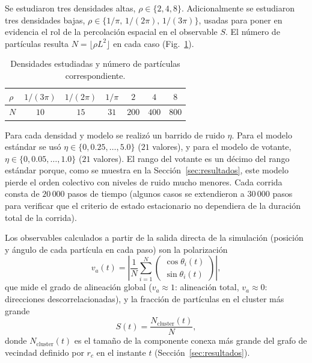 \documentclass[11pt,a4paper]{article}
\begin{document}
Se estudiaron tres densidades altas, $\rho \in \{2, 4, 8\}$. Adicionalmente
se estudiaron tres densidades bajas, $\rho \in \{1/\pi,\, 1/(2\pi),\,
1/(3\pi)\}$, usadas para poner en evidencia el rol de la percolación
espacial en el observable $S$. El número de partículas resulta
$N = \lfloor \rho L^2 \rfloor$ en cada caso (Fig.~\ref{fig:densidades}).

\begin{table}[h]
  \centering
  \caption{Densidades estudiadas y número de partículas correspondiente.}
  \label{fig:densidades}
  \begin{tabular}{@{}lcccccc@{}}
    \toprule
    $\rho$ & $1/(3\pi)$ & $1/(2\pi)$ & $1/\pi$ & $2$ & $4$ & $8$ \\
    \midrule
    $N$ & $10$ & $15$ & $31$ & $200$ & $400$ & $800$ \\
    \bottomrule
  \end{tabular}
\end{table}

Para cada densidad y modelo se realizó un barrido de ruido $\eta$. Para el
modelo estándar se usó $\eta \in \{0, 0.25, \ldots, 5.0\}$ ($21$ valores),
y para el modelo de votante, $\eta \in \{0, 0.05, \ldots, 1.0\}$
($21$ valores). El rango del votante es un décimo del rango estándar
porque, como se muestra en la Sección~\ref{sec:resultados}, este modelo
pierde el orden colectivo con niveles de ruido mucho menores. Cada corrida
consta de $20\,000$ pasos de
tiempo (algunos casos se extendieron a $30\,000$ pasos para verificar que el
criterio de estado estacionario no dependiera de la duración total de la
corrida).

Los observables calculados a partir de la salida directa de la simulación
(posición y ángulo de cada partícula en cada paso) son la polarización
\begin{equation}
  v_a(t) = \left| \frac{1}{N} \sum_{i=1}^{N}
    \begin{pmatrix} \cos\theta_i(t) \\ \sin\theta_i(t) \end{pmatrix} \right|,
  \label{eq:va}
\end{equation}
que mide el grado de alineación global ($v_a \approx 1$: alineación total,
$v_a \approx 0$: direcciones descorrelacionadas), y la fracción de
partículas en el cluster más grande
\begin{equation}
  S(t) = \frac{N_{\text{cluster}}(t)}{N},
  \label{eq:s}
\end{equation}
donde $N_{\text{cluster}}(t)$ es el tamaño de la componente conexa más
grande del grafo de vecindad definido por $r_c$ en el instante $t$
(Sección~\ref{sec:resultados}).
\end{document}
